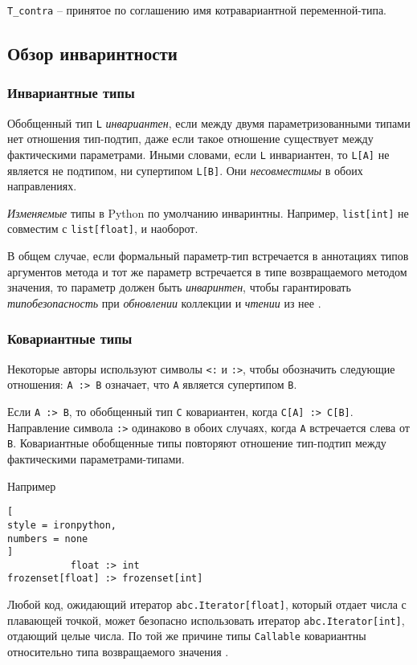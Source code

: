 \documentclass[%
	11pt,
	a4paper,
	utf8,
		]{article}
\begin{document}
\verb|T_contra| -- принятое по соглашению имя котравариантной переменной-типа.

\subsection{Обзор инваринтности}

\subsubsection{Инвариантные типы}

Обобщенный тип \verb*|L| \emph{инвариантен}, если между двумя параметризованными типами нет отношения тип-подтип, даже если такое отношение существует между фактическими параметрами. Иными словами, если \verb|L| инвариантен, то \verb*|L[A]| не является не подтипом, ни супертипом \verb|L[B]|. Они \emph{несовместимы} в обоих направлениях.

\emph{Изменяемые} типы в Python по умолчанию инваринтны. Например, \verb*|list[int]| не совместим с \verb|list[float]|, и наоборот.

В общем случае, если формальный параметр-тип встречается в аннотациях типов аргументов метода и тот же параметр встречается в типе возвращаемого методом значения, то параметр должен быть \emph{инваринтен}, чтобы гарантировать \emph{типобезопасность} при \emph{обновлении} коллекции и \emph{чтении} из нее \cite[]{ramalho:python-2022}.

\subsubsection{Ковариантные типы}

Некоторые авторы используют символы \verb*|<:| и \verb|:>|, чтобы обозначить следующие отношения: \verb|A :> B| означает, что \verb|A| является супертипом \verb*|B|.

Если \verb|A :> B|, то обобщенный тип \verb*|C| ковариантен, когда \verb|C[A] :> C[B]|. Направление символа \verb*|:>| одинаково в обоих случаях, когда \verb|A| встречается слева от \verb*|B|. Ковариантные обобщенные типы повторяют отношение тип-подтип между фактическими параметрами-типами.

Например
\begin{lstlisting}[
style = ironpython,
numbers = none
]
           float :> int
frozenset[float] :> frozenset[int]
\end{lstlisting}

Любой код, ожидающий итератор \verb|abc.Iterator[float]|, который отдает числа с плавающей точкой, может безопасно использовать итератор \verb*|abc.Iterator[int]|, отдающий целые числа. По той же причине типы \verb|Callable| ковариантны относительно типа возвращаемого значения \cite[]{ramalho:python-2022}.
\end{document}
